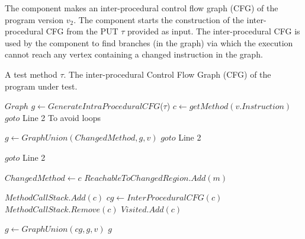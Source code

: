 The  component makes an inter-procedural control flow graph (CFG) of the program version $v_2$. The  component starts the construction of the inter-procedural CFG from the PUT $\tau$ provided as input. The inter-procedural CFG is used by the  component to find branches (in the graph) via which the execution cannot reach any vertex containing a changed instruction in the graph.
\newcommand{\factorial}{\ensuremath{\mbox{\sc Factorial}}}
\begin{algorithm}[h!]
\caption{$InterProceduralCFG(\tau)$}\label{alg:factorial}
\begin{algorithmic}[1]
\REQUIRE A test method $\tau$.
\ENSURE The inter-procedural Control Flow Graph (CFG) of the program under test.

\medskip

\STATE $Graph$ $g \leftarrow GenerateIntraProceduralCFG$($\tau$)
 \STATE $c \leftarrow getMethod(v.Instruction)$
 \STATE $goto$ Line 2 To avoid loops
 \ENDIF
 
 
  \STATE $g \leftarrow GraphUnion(ChangedMethod, g, v)$ 
  \STATE $goto$ Line 2
 \ENDIF 
 
  \STATE $goto$ Line 2
 \ENDIF 
 
	 \STATE $ChangedMethod \leftarrow c $
		 \STATE $ReachableToChangedRegion.Add(m)$	
 	 \ENDFOR
 \ENDIF
 
 
 		
 \STATE $MethodCallStack.Add(c)$
 \STATE $cg \leftarrow InterProceduralCFG(c)$ 
 \STATE $MethodCallStack.Remove(c)$
 \STATE $Visited.Add(c)$
 
 \STATE $g \leftarrow GraphUnion(cg, g, v)$
 \ENDIF
\ENDFOR
\RETURN $g$
\label{alg:ICFG}
\end{algorithmic}
\end{algorithm}

